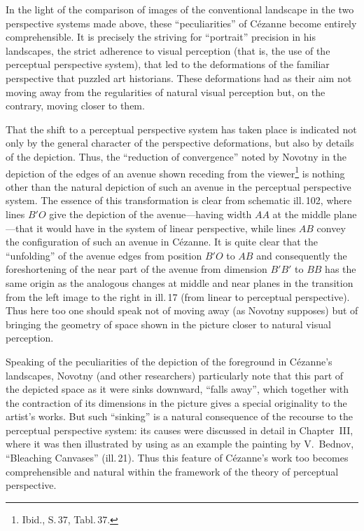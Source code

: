 

In the light of the comparison of images of the conventional landscape in the two
perspective systems made above, these ``peculiarities'' of Cézanne become entirely
comprehensible. It is precisely the striving for ``portrait'' precision in his
landscapes, the strict adherence to visual perception (that is, the use of the
perceptual perspective system), that led to the deformations of the familiar
perspective that puzzled art historians. These deformations had as their aim not
moving away from the regularities of natural visual perception but, on the contrary,
moving closer to them.

That the shift to a perceptual perspective system has taken place is indicated not
only by the general character of the perspective deformations, but also by details
of the depiction. Thus, the ``reduction of convergence'' noted by Novotny in the
depiction of the edges of an avenue shown receding from the
viewer\footnote{Ibid., S.\,37, Tabl.\,37.} is nothing other than the natural
depiction of such an avenue in the perceptual perspective system. The essence of
this transformation is clear from schematic ill.\,102, where lines $B'O$ give the
depiction of the avenue---having width $AA$ at the middle plane---that it would have
in the system of linear perspective, while lines $AB$ convey the configuration of
such an avenue in Cézanne. It is quite clear that the ``unfolding'' of the avenue
edges from position $B'O$ to $AB$ and consequently the foreshortening of the near
part of the avenue from dimension $B'B'$ to $BB$ has the same origin as the
analogous changes at middle and near planes in the transition from the left image to
the right in ill.\,17 (from linear to perceptual perspective). Thus here too one
should speak not of moving away (as Novotny supposes) but of bringing the geometry
of space shown in the picture closer to natural visual perception.

Speaking of the peculiarities of the depiction of the foreground in Cézanne's
landscapes, Novotny (and other researchers) particularly note that this part of the
depicted space as it were sinks downward, ``falls away'', which together with the
contraction of its dimensions in the picture gives a special originality to the
artist's works. But such ``sinking'' is a natural consequence of the recourse to
the perceptual perspective system: its causes were discussed in detail in
Chapter~III, where it was then illustrated by using as an example the painting by
V.~Bednov, ``Bleaching Canvases'' (ill.\,21). Thus this feature of Cézanne's work
too becomes comprehensible and natural within the framework of the theory of
perceptual perspective.

